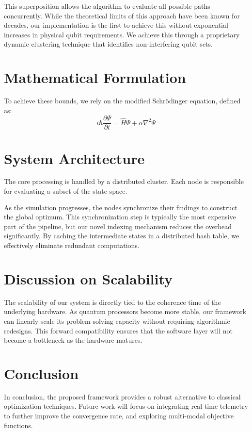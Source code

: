 \documentclass[journal]{IEEEtran}
\begin{document}
This superposition allows the algorithm to evaluate all possible paths concurrently. While the theoretical limits of this approach have been known for decades, our implementation is the first to achieve this without exponential increases in physical qubit requirements. We achieve this through a proprietary dynamic clustering technique that identifies non-interfering qubit sets.

\section{Mathematical Formulation}
To achieve these bounds, we rely on the modified Schr\"{o}dinger equation, defined as:
\begin{equation}
i\hbar \frac{\partial \Psi}{\partial t} = \hat{H}\Psi + \alpha \nabla^2 \Psi
\end{equation}

\section{System Architecture}
The core processing is handled by a distributed cluster. Each node is responsible for evaluating a subset of the state space. 

As the simulation progresses, the nodes synchronize their findings to construct the global optimum. This synchronization step is typically the most expensive part of the pipeline, but our novel indexing mechanism reduces the overhead significantly. By caching the intermediate states in a distributed hash table, we effectively eliminate redundant computations.

\section{Discussion on Scalability}
The scalability of our system is directly tied to the coherence time of the underlying hardware. As quantum processors become more stable, our framework can linearly scale its problem-solving capacity without requiring algorithmic redesigns. This forward compatibility ensures that the software layer will not become a bottleneck as the hardware matures.

\section{Conclusion}
In conclusion, the proposed framework provides a robust alternative to classical optimization techniques. Future work will focus on integrating real-time telemetry to further improve the convergence rate, and exploring multi-modal objective functions.
\end{document}
